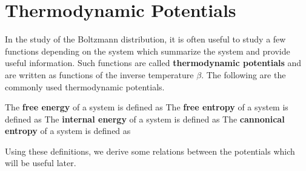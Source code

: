 \documentclass[letterpaper,english,10pt]{article}
\begin{document}
\section{Thermodynamic Potentials} 
In the study of the Boltzmann distribution, it is often useful to study a few functions depending on the system which summarize the system and provide useful information. 
Such functions are called \textbf{thermodynamic potentials} and are written as functions of the inverse temperature $\beta$. 
The following are the commonly used thermodynamic potentials. 
\begin{defn}
The \textbf{free energy} of a system is defined as 
The \textbf{free entropy} of a system is defined as 
The \textbf{internal energy} of a system is defined as 
The \textbf{cannonical entropy} of a system is defined as 
\end{defn}
Using these definitions, we derive some relations between the potentials which will be useful later. 
\end{document}
